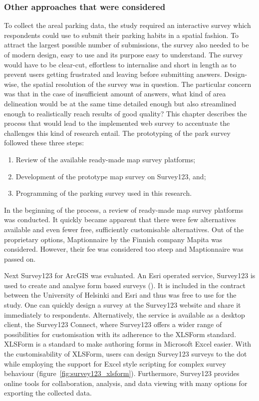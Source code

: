 \subsubsection{Other approaches that were considered}
\justify

To collect the areal parking data, the study required an interactive survey which respondents could use to submit their parking habits in a spatial fashion. To attract the largest possible number of submissions, the survey also needed to be of modern design, easy to use and its purpose easy to understand. The survey would have to be clear-cut, effortless to internalise and short in length as to prevent users getting frustrated and leaving before submitting answers. Design-wise, the spatial resolution of the survey was in question. The particular concern was that in the case of insufficient amount of answers, what kind of area delineation would be at the same time detailed enough but also streamlined enough to realistically reach results of good quality? This chapter describes the process that would lead to the implemented web survey to accentuate the challenges this kind of research entail. The prototyping of the park survey followed these three steps:

\begin{enumerate}
    \item Review of the available ready-made map survey platforms;
    \item Development of the prototype map survey on Survey123, and;
    \item Programming of the parking survey used in this research.
\end{enumerate}

In the beginning of the process, a review of ready-made map survey platforms was conducted. It quickly became apparent that there were few alternatives available and even fewer free, sufficiently customisable alternatives. Out of the proprietary options, Maptionnaire by the Finnish company Mapita was considered. However, their fee was considered too steep and Maptionnaire was passed on. 

Next Survey123 for ArcGIS was evaluated. An Esri operated service, Survey123 is used to create and analyse form based surveys (\cite{Esri}). It is included in the contract between the University of Helsinki and Esri and thus was free to use for the study. One can quickly design a survey at the Survey123 website and share it immediately to respondents. Alternatively, the service is available as a desktop client, the Survey123 Connect, where Survey123 offers a wider range of possibilities for customisation with its adherence to the XLSForm standard. XLSForm is a standard to make authoring forms in Microsoft Excel easier. With the customisability of XLSForm, users can design Survey123 surveys to the dot while employing the support for Excel style scripting for complex survey behaviour (figure~\ref{fig:survey123_xlsform}). Furthermore, Survey123 provides online tools for collaboration, analysis, and data viewing with many options for exporting the collected data.

